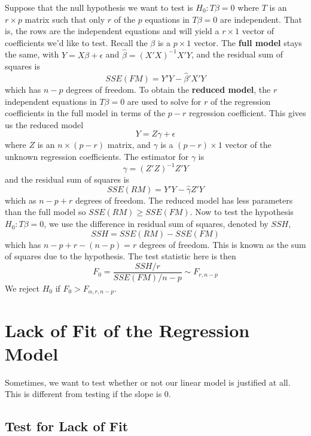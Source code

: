  Suppose that the null hypothesis we want to test is $H_0: T\beta = 0$ where $T$ is an $r \times p$ matrix such that only $r$ of the $p$ equations in $T\beta = 0$ are independent. That is, the rows are the independent equations and will yield a $r \times 1$ vector of coefficients we'd like to test. Recall the $\beta$ is a $p\times 1$ vector. The \textbf{full model} stays the same, with $Y = X\beta + \epsilon$ and $\hat{\beta} = (X'X)^{-1}X'Y$, and the residual sum of squares is 
 \[SSE(FM) = Y'Y - \hat{\beta}'X'Y\]
 which has $n-p$ degrees of freedom. To obtain the \textbf{reduced model}, the $r$ independent equations in $T\beta = 0$ are used to solve for $r$ of the regression coefficients in the full model in terms of the $p-r$ regression coefficient. This gives us the reduced model 
 \[Y = Z\gamma + \epsilon\]
 where $Z$ is an $n \times (p-r)$ matrix, and $\gamma$ is a $(p-r) \times 1$ vector of the unknown regression coefficients. The estimator for $\gamma$ is 
 \[\hat{\gamma} = (Z'Z)^{-1}Z'Y\]
 and the residual sum of squares is 
 \[SSE(RM) = Y'Y - \hat{\gamma}Z'Y\]
 which as $n - p + r$ degrees of freedom. The reduced model has less parameters than the full model so $SSE(RM) \geq SSE(FM)$. Now to test the hypothesis $H_0: T\beta = 0$, we use the difference in residual sum of squares, denoted by $SSH$,
 \[SSH = SSE(RM) - SSE(FM)\]
 which has $n-p + r - (n - p) = r$ degrees of freedom. This is known as the sum of squares due to the hypothesis. The test statistic here is then 
 \[F_0 = \frac{SSH/r}{SSE(FM)/n-p} \sim F_{r, n-p}\]
 We reject $H_0$ if $F_0 > F_{\alpha, r, n-p}$.\\

\section{Lack of Fit of the Regression Model}

Sometimes, we want to test whether or not our linear model is justified at all. This is different from testing if the slope is 0.

\subsection{Test for Lack of Fit}


